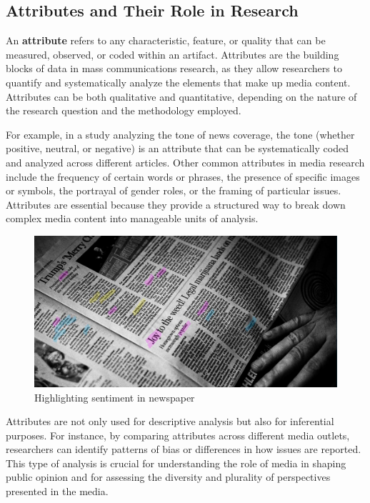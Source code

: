 \documentclass[
]{book}
\begin{document}
\subsection*{Attributes and Their Role in Research}\label{attributes-and-their-role-in-research}

An \textbf{attribute} refers to any characteristic, feature, or quality that can be measured, observed, or coded within an artifact. Attributes are the building blocks of data in mass communications research, as they allow researchers to quantify and systematically analyze the elements that make up media content. Attributes can be both qualitative and quantitative, depending on the nature of the research question and the methodology employed.

For example, in a study analyzing the tone of news coverage, the tone (whether positive, neutral, or negative) is an attribute that can be systematically coded and analyzed across different articles. Other common attributes in media research include the frequency of certain words or phrases, the presence of specific images or symbols, the portrayal of gender roles, or the framing of particular issues. Attributes are essential because they provide a structured way to break down complex media content into manageable units of analysis.

\begin{figure}
\centering
\includegraphics[width=1\linewidth,height=\textheight,keepaspectratio]{images/fig01a.jpg}
\caption{Highlighting sentiment in newspaper}
\end{figure}

Attributes are not only used for descriptive analysis but also for inferential purposes. For instance, by comparing attributes across different media outlets, researchers can identify patterns of bias or differences in how issues are reported. This type of analysis is crucial for understanding the role of media in shaping public opinion and for assessing the diversity and plurality of perspectives presented in the media.
\end{document}
